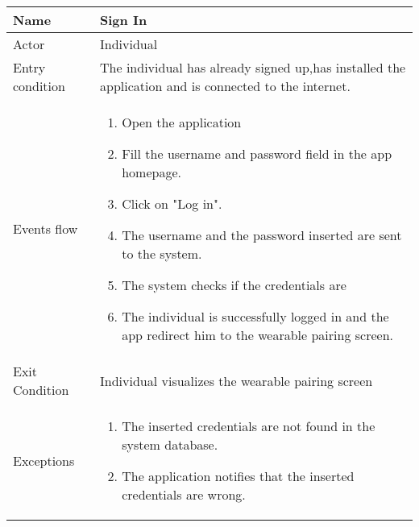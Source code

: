 \begin{tabular}{|l|p{13cm}|}
    \hline
    Name & Sign In
    \\ \hline
    Actor & Individual
    \\ \hline 
    Entry condition & The individual has already signed up,has installed the application and is connected to the internet.
    \\ \hline
    Events flow &
    \begin{enumerate}
    \item Open the application
    \item Fill the username and password field in the app homepage.
    \item Click on "Log in".
    \item The username and the password inserted are sent to the system.
    \item The system checks if the credentials are 
    \item The individual is successfully logged in and the app redirect him to the wearable pairing screen.
    \end{enumerate}
     \\ \hline
     Exit Condition & Individual visualizes the wearable pairing screen
     \\
    \hline
    Exceptions &
        \begin{enumerate}
    \item The inserted credentials are not found in the system database. 
    \item The application notifies that the inserted credentials are wrong.
    \end{enumerate}
      \\
    \hline
\end{tabular}


